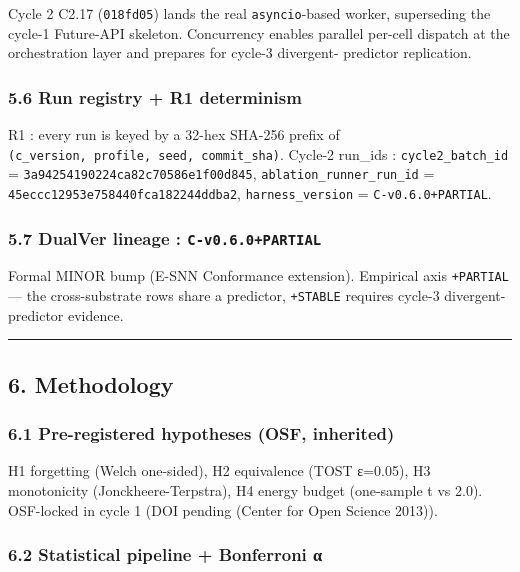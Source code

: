 \documentclass[
]{article}
\begin{document}
Cycle 2 C2.17 (\texttt{018fd05}) lands the real \texttt{asyncio}-based
worker, superseding the cycle-1 Future-API skeleton. Concurrency enables
parallel per-cell dispatch at the orchestration layer and prepares for
cycle-3 divergent- predictor replication.

\subsubsection{5.6 Run registry + R1
determinism}\label{run-registry-r1-determinism}

R1 : every run is keyed by a 32-hex SHA-256 prefix of
\texttt{(c\_version,\ profile,\ seed,\ commit\_sha)}. Cycle-2 run\_ids :
\texttt{cycle2\_batch\_id} = \texttt{3a94254190224ca82c70586e1f00d845},
\texttt{ablation\_runner\_run\_id} =
\texttt{45eccc12953e758440fca182244ddba2}, \texttt{harness\_version} =
\texttt{C-v0.6.0+PARTIAL}.

\subsubsection{\texorpdfstring{5.7 DualVer lineage :
\texttt{C-v0.6.0+PARTIAL}}{5.7 DualVer lineage : C-v0.6.0+PARTIAL}}\label{dualver-lineage-c-v0.6.0partial}

Formal MINOR bump (E-SNN Conformance extension). Empirical axis
\texttt{+PARTIAL} --- the cross-substrate rows share a predictor,
\texttt{+STABLE} requires cycle-3 divergent-predictor evidence.

\begin{center}\rule{0.5\linewidth}{0.5pt}\end{center}

\subsection{6. Methodology}\label{methodology}

\subsubsection{6.1 Pre-registered hypotheses (OSF,
inherited)}\label{pre-registered-hypotheses-osf-inherited}

H1 forgetting (Welch one-sided), H2 equivalence (TOST ε=0.05), H3
monotonicity (Jonckheere-Terpstra), H4 energy budget (one-sample t vs
2.0). OSF-locked in cycle 1 (DOI pending (Center for Open Science
2013)).

\subsubsection{6.2 Statistical pipeline + Bonferroni
α}\label{statistical-pipeline-bonferroni-ux3b1}
\end{document}
